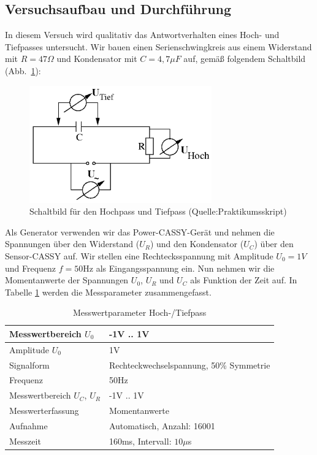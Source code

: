 \documentclass[12pt,a4paper]{article}
\begin{document}
\subsection{Versuchsaufbau und Durchführung}
In diesem Versuch wird qualitativ das Antwortverhalten eines Hoch- und Tiefpasses untersucht. Wir bauen einen Serienschwingkreis aus einem Widerstand mit $R=47\Omega$ und Kondensator mit $C=4,7\mu F$ auf, gemäß folgendem Schaltbild (Abb.~\ref{HT_Schaltbild}):
\begin{figure}[H]
	\centering
	\includegraphics[width=0.7\textwidth]{Daten/Schaltkreis_HochTiefpass.png}
	\caption{Schaltbild für den Hochpass und Tiefpass (Quelle:Praktikumsskript)}
	\label{HT_Schaltbild}
\end{figure}
Als Generator verwenden wir das Power-CASSY-Gerät und nehmen die Spannungen über den Widerstand ($U_R$) und den Kondensator ($U_C$) über den Sensor-CASSY auf. Wir stellen eine Rechtecksspannung mit Amplitude $U_0=1V$ und Frequenz $f=50$Hz als Eingangsspannung ein. Nun nehmen wir die Momentanwerte der Spannungen $U_0$, $U_R$ und $U_C$ als Funktion der Zeit auf. In Tabelle \ref{table:Messwerterfassung_HT} werden die Messparameter zusammengefasst.
\begin{table}[H]
	\centering
	\begin{tabular}{|l|l|}
		\hline
		Messwertbereich $U_0$&-1V .. 1V\\
		\hline
		Amplitude $U_0$&1V\\
		\hline
		Signalform&Rechteckwechselspannung, 50\% Symmetrie\\
		\hline
		Frequenz&50Hz\\
		\hline
		Messwertbereich $U_C$, $U_R$&-1V .. 1V\\
		\hline
		Messwerterfassung&Momentanwerte\\
		\hline
		Aufnahme&Automatisch, Anzahl: 16001\\
		\hline
		Messzeit&160ms, Intervall: $10\mu$s\\
		\hline
	\end{tabular}
	\caption{Messwertparameter Hoch-/Tiefpass}
	\label{table:Messwerterfassung_HT}
\end{table}
\end{document}
